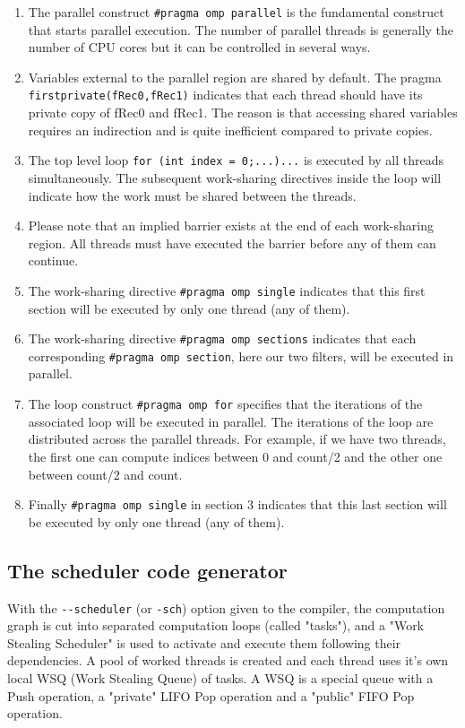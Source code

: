 \begin{enumerate}
\item The parallel construct \lstinline!#pragma omp parallel! is the fundamental construct that starts parallel execution. The number of parallel threads is generally the number of CPU cores but it can be controlled in several ways.

\item Variables external to the parallel region are shared by default. The pragma \lstinline!firstprivate(fRec0,fRec1)! indicates that each thread should have its private copy of fRec0 and fRec1. The reason is that accessing shared variables requires an indirection and is quite inefficient compared to private copies.

\item The top level loop \lstinline!for (int index = 0;...)...! is executed by all threads simultaneously. The subsequent work-sharing directives inside the loop will indicate how the work must be shared between the threads. 

\item Please note that an implied barrier exists at the end of each work-sharing region. All threads must have executed the barrier before any of them can continue.

\item The work-sharing directive \lstinline!#pragma omp single! indicates that this first section will be executed by only one thread (any of them).

\item The work-sharing directive \lstinline!#pragma omp sections! indicates that each corresponding \lstinline!#pragma omp section!, here our two filters, will be executed in parallel.

\item The loop construct \lstinline!#pragma omp for! specifies that the iterations of the associated loop will be executed in parallel. The iterations of the loop are distributed across the parallel threads. For example, if we have two threads, the first one can compute indices between 0 and count/2 and the other one between count/2 and count. 

\item Finally \lstinline!#pragma omp single!  in section 3 indicates that this last section will be executed by only one thread (any of them).

\end{enumerate}

\subsection{The scheduler code generator}
 With the \lstinline!--scheduler! (or \lstinline!-sch!) option given to the \faust compiler, the computation graph is cut into separated computation loops (called "tasks"), and a "Work Stealing Scheduler" is used to activate and execute them following their dependencies. A pool of worked threads is created and each thread uses it's own local WSQ (Work Stealing Queue) of tasks. A WSQ is a special queue with a Push operation, a "private" LIFO Pop operation and a "public" FIFO Pop operation.

